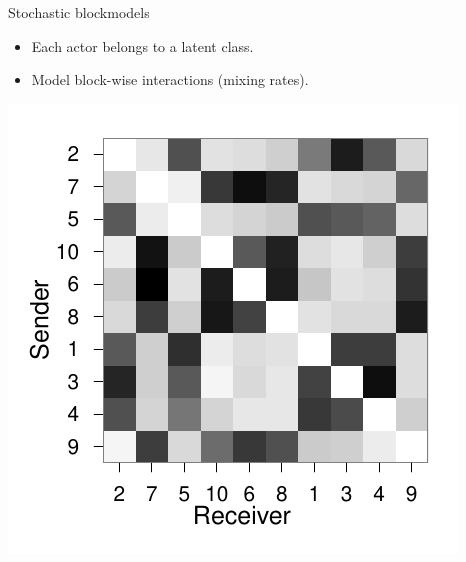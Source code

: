 \documentclass{beamer}
\begin{document}
\begin{frame}{Stochastic blockmodels}

\begin{itemize}
\item Each actor belongs to a latent class. 
\item Model block-wise interactions (mixing rates).
\end{itemize}

\includegraphics[scale=.45]{../../figs/synthetic/unsorted}

\end{frame}
\end{document}
